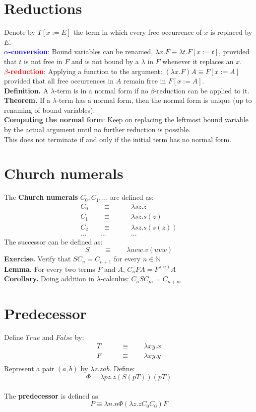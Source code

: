 \documentclass{article}
\begin{document}
\section{Reductions}
Denote by $T[x := E]$ the term in which every free occurrence of $x$ is replaced by $E$.\medskip
\\\textbf{\textcolor{blue}{$\alpha$-conversion}}: Bound variables can be renamed, $\lambda x.F \equiv \lambda t.F[x := t]$, provided that $t$ is not free in $F$ and is not bound by a $\lambda$ in $F$ whenever it replaces an $x$.\medskip
\\\textbf{\textcolor{red}{$\beta$-reduction}}: Applying a function to the argument: $(\lambda x.F)A \equiv F[x:=A]$ provided that all free occurrences in $A$ remain free in $F [x:=A]$.\medskip
\\\textbf{Definition.} A $\lambda$-term is in a normal form if no $\beta$-reduction can be applied to it.\medskip
\\\textbf{Theorem.} If a $\lambda$-term has a normal form, then the normal form is unique (up to renaming of bound variables).\medskip
\\\textbf{Computing the normal form}: Keep on replacing the leftmost bound variable by the actual argument until no further reduction is possible.
\\ This does not terminate if and only if the initial term has no normal form.

\section{Church numerals}
The \textbf{Church numerals} $C_0, C_1, ...$ are defined as:
\begin{align*}
C_0\qquad\equiv&\qquad\lambda sz.z \\
C_1\qquad\equiv&\qquad\lambda sz.s(z) \\
C_2\qquad\equiv&\qquad\lambda sz.s(s(z)) \\
...\qquad...&\qquad...
\end{align*}
The successor can be defined as:
$$S\qquad\equiv\qquad\lambda uvw.v(uvw)$$
\textbf{Exercise.} Verify that $SC_n = C_{n+1}$ for every $n \in \mathbb{N}$\medskip
\\\textbf{Lemma.} For every two terms $F$ and $A$, $C_nFA = F^{(n)}A$\medskip
\\\textbf{Corollary.} Doing addition in $\lambda$-calculus: $C_nSC_m = C_{n+m}$


\section{Predecessor}
Define $True$ and $False$ by:
\begin{align*}
T\qquad&\equiv\qquad\lambda xy.x\\
F\qquad&\equiv\qquad\lambda xy.y\\
\end{align*}
Represent a pair $(a, b)$ by $\lambda z.zab$. Define:
$$\Phi = \lambda pz.z(S(pT))(pT)$$\medskip
\\ The \textbf{predecessor} is defined as:
$$P\equiv \lambda n.n\Phi(\lambda z.zC_0C_0)F$$
\end{document}
